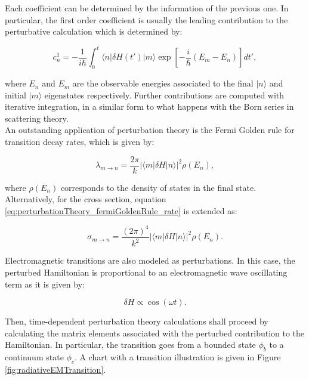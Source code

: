 \documentclass[openany]{book}
\begin{document}
Each coefficient can be determined by the information of the previous one. In particular, the first order coefficient is usually the leading contribution to the perturbative calculation which is determined by:

\begin{equation} \label{eq:perturbationTheory_timeDeependent_c}
	c^{1}_{n} = - \frac{1}{i\hbar} \int_{0}^{t} \langle n | \delta H (t') | m \rangle  \exp { \left[ -\frac{i}{\hbar}(E_m - E_n) \right] } dt', 
\end{equation}

where $E_n$ and  $E_m$ are the observable energies associated to the final $|n \rangle$ and initial  $|m \rangle$ eigenstates respectively. Further contributions are computed with iterative integration, in a similar form to what happens with the Born series in scattering theory. \\

An outstanding application of perturbation theory is the Fermi Golden rule for transition decay rates, which is given by:

\begin{equation} \label{eq:perturbationTheory_fermiGoldenRule_rate}
	\lambda_{m\rightarrow n} = \frac{2\pi}{k} |\langle m | \delta H| n \rangle|^2 \rho(E_n),
\end{equation}

where $\rho(E_n)$ corresponds to the density of states in the final state. Alternatively, for the cross section, equation \ref{eq:perturbationTheory_fermiGoldenRule_rate} is extended as: 

 \begin{equation} \label{eq:perturbationTheory_fermiGoldenRule_crossSection}
 	\sigma_{m\rightarrow n} = \frac{(2\pi)^4}{k^2} |\langle m | \delta H| n \rangle|^2 \rho(E_n).
 \end{equation}
 
Electromagnetic transitions are also modeled as perturbations. In this case, the perturbed Hamiltonian is proportional to an electromagnetic wave oscillating term as it is given by:

\begin{equation} \label{eq:perturbationTheory_radiativeTransition}
	\delta H \propto \cos(\omega t).
\end{equation}

Then, time-dependent perturbation theory calculations shall proceed by calculating the matrix elements associated with the perturbed contribution to the Hamiltonian. In particular, the transition goes from a bounded state $\phi_b$ to a  continuum state $\phi_c$.  A chart with a transition illustration is given in Figure \ref{fig:radiativeEMTransition}. \\  
\end{document}
